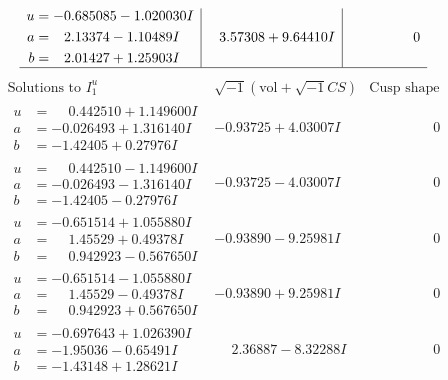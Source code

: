 \documentclass[1p]{elsarticle_modified}
\theoremstyle{definition}
\newcommand{\I}{\sqrt{-1}}
\begin{document}
$$\begin{array}{c|c|c}
\begin{aligned}
u &= -0.685085 - 1.020030 I \\
a &= \phantom{-}2.13374 - 1.10489 I \\
b &= \phantom{-}2.01427 + 1.25903 I\end{aligned}
 & \phantom{-}3.57308 + 9.64410 I & \phantom{-0.000000 } 0\\
 \hline 
 \end{array}$$\newpage$$\begin{array}{c|c|c}  
\text{Solutions to }I^u_{1}& \I (\text{vol} + \sqrt{-1}CS) & \text{Cusp shape}\\
 \hline 
\begin{aligned}
u &= \phantom{-}0.442510 + 1.149600 I \\
a &= -0.026493 + 1.316140 I \\
b &= -1.42405 + 0.27976 I\end{aligned}
 & -0.93725 + 4.03007 I & \phantom{-0.000000 } 0 \\ \hline\begin{aligned}
u &= \phantom{-}0.442510 - 1.149600 I \\
a &= -0.026493 - 1.316140 I \\
b &= -1.42405 - 0.27976 I\end{aligned}
 & -0.93725 - 4.03007 I & \phantom{-0.000000 } 0 \\ \hline\begin{aligned}
u &= -0.651514 + 1.055880 I \\
a &= \phantom{-}1.45529 + 0.49378 I \\
b &= \phantom{-}0.942923 - 0.567650 I\end{aligned}
 & -0.93890 - 9.25981 I & \phantom{-0.000000 } 0 \\ \hline\begin{aligned}
u &= -0.651514 - 1.055880 I \\
a &= \phantom{-}1.45529 - 0.49378 I \\
b &= \phantom{-}0.942923 + 0.567650 I\end{aligned}
 & -0.93890 + 9.25981 I & \phantom{-0.000000 } 0 \\ \hline\begin{aligned}
u &= -0.697643 + 1.026390 I \\
a &= -1.95036 - 0.65491 I \\
b &= -1.43148 + 1.28621 I\end{aligned}
 & \phantom{-}2.36887 - 8.32288 I & \phantom{-0.000000 } 0 \\ \hline\begin{aligned}

\end{aligned}
\end{array}$$
\end{document}
